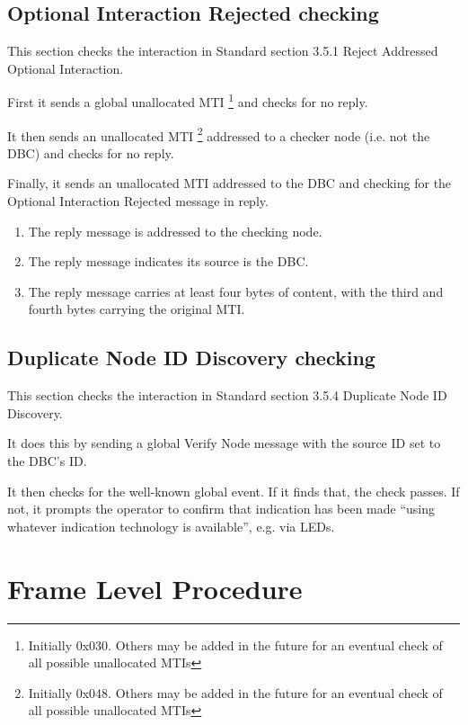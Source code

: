 \subsection{Optional Interaction Rejected checking}

This section checks the interaction in Standard section 3.5.1 Reject Addressed Optional Interaction.

First it sends a global unallocated MTI
\footnote{Initially 0x030. Others may be added in the future for an eventual
    check of all possible unallocated MTIs}
and checks for no reply.

It then sends an unallocated MTI
\footnote{Initially 0x048. Others may be added in the future for an eventual
    check of all possible unallocated MTIs}
addressed to a checker node (i.e. not the DBC)
and checks for no reply.

Finally, it sends an unallocated MTI
addressed to the DBC and checking for the Optional Interaction Rejected 
message in reply.

    \begin{enumerate}
    \item The reply message is addressed to the checking node.
    \item The reply message indicates its source is the DBC.
    \item The reply message carries at least four bytes of content, with the 
            third and fourth bytes carrying the original MTI.
    \end{enumerate}

\subsection{Duplicate Node ID Discovery checking}

This section checks the interaction in Standard section 3.5.4 Duplicate Node ID Discovery.

It does this by sending a global Verify Node message with the source ID set to the DBC's ID.

It then checks for the well-known global event.  If it finds that, the check passes.
If not, it prompts the operator to confirm that indication has been made 
``using whatever indication technology is available'', e.g. via LEDs.

\section{Frame Level Procedure}

